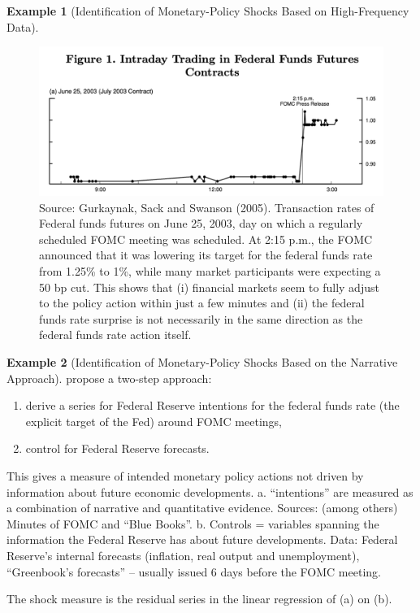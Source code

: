 \documentclass[
  12pt,
]{book}
\providecommand{\tightlist}{%
  \setlength{\itemsep}{0pt}\setlength{\parskip}{0pt}}
\theoremstyle{definition}
\theoremstyle{definition}
\newtheorem{example}{Example}[chapter]
\theoremstyle{definition}
\theoremstyle{definition}
\theoremstyle{remark}
\begin{document}
\begin{example}[Identification of Monetary-Policy Shocks Based on High-Frequency Data]
\begin{figure}
\includegraphics[width=0.95\linewidth]{images/GSS2005_HFI} \caption{Source: Gurkaynak, Sack and Swanson (2005). Transaction rates of Federal funds futures on June 25, 2003, day on which a regularly scheduled FOMC meeting was scheduled. At 2:15 p.m., the FOMC announced that it was lowering its target for the federal funds rate from 1.25\% to 1\%, while many market participants were expecting a 50 bp cut. This shows that (i) financial markets seem to fully adjust to the policy action within just a few minutes and (ii) the federal funds rate surprise is not necessarily in the same direction as the federal funds rate action itself.}\label{fig:HighFreq}
\end{figure}

\end{example}

\begin{example}[Identification of Monetary-Policy Shocks Based on the Narrative Approach]
\protect\hypertarget{exm:RomerRomer}{}\label{exm:RomerRomer}\citet{Romer_Romer_2004} propose a two-step approach:

\begin{enumerate}
\def\labelenumi{\alph{enumi}.}
\tightlist
\item
  derive a series for Federal Reserve intentions for the federal funds rate (the explicit target of the Fed) around FOMC meetings,
\item
  control for Federal Reserve forecasts.
\end{enumerate}

This gives a measure of intended monetary policy actions not driven by information about future economic developments.
a. ``intentions'' are measured as a combination of narrative and quantitative evidence. Sources: (among others) Minutes of FOMC and ``Blue Books''.
b. Controls = variables spanning the information the Federal Reserve has about future developments. Data: Federal Reserve's internal forecasts (inflation, real output and unemployment), ``Greenbook's forecasts'' -- usually issued 6 days before the FOMC meeting.

The shock measure is the residual series in the linear regression of (a) on (b).
\end{example}
\end{document}
